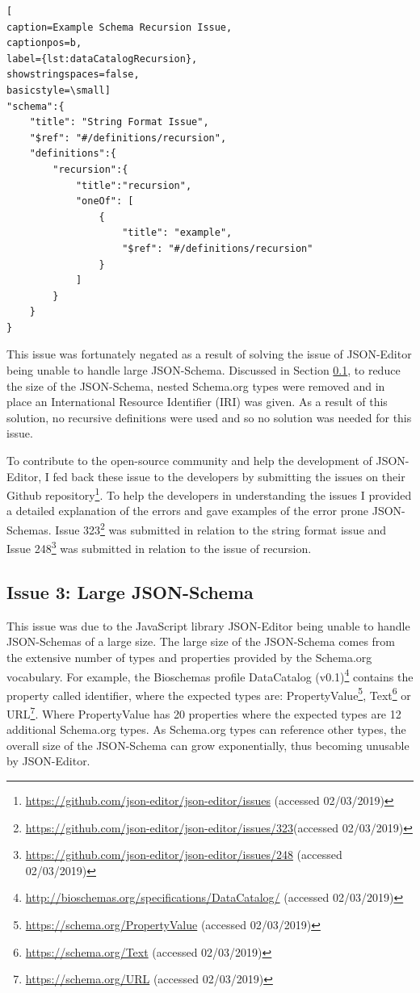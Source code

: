 {
\begin{center}
\begin{lstlisting}[
caption=Example Schema Recursion Issue,
captionpos=b,
label={lst:dataCatalogRecursion},
showstringspaces=false,
basicstyle=\small]
"schema":{
    "title": "String Format Issue",
    "$ref": "#/definitions/recursion",
    "definitions":{
        "recursion":{
            "title":"recursion",
            "oneOf": [
                {
                    "title": "example",
                    "$ref": "#/definitions/recursion"
                }
            ]
        }
    }
}
\end{lstlisting}  
\end{center}
}

This issue was fortunately negated as a result of solving the issue of JSON-Editor being unable to handle large JSON-Schema. Discussed in Section \ref{sec:largeSchema}, to reduce the size of the JSON-Schema, nested Schema.org types were removed and in place an International Resource Identifier (IRI) was given. As a result of this solution, no recursive definitions were used and so no solution was needed for this issue.


To contribute to the open-source community and help the development of JSON-Editor, I fed back these issue to the developers by submitting the issues on their Github repository\footnote{\url{https://github.com/json-editor/json-editor/issues} (accessed 02/03/2019)}. To help the developers in understanding the issues I provided a detailed explanation of the errors and gave examples of the error prone JSON-Schemas. Issue 323\footnote{\url{https://github.com/json-editor/json-editor/issues/323}(accessed 02/03/2019)} was submitted in relation to the string format issue and  Issue 248\footnote{\url{https://github.com/json-editor/json-editor/issues/248} (accessed 02/03/2019)} was submitted in relation to the issue of recursion.

\newpage
\subsection{Issue 3: Large JSON-Schema}\label{sec:largeSchema}
This issue was due to the JavaScript library JSON-Editor being unable to handle JSON-Schemas of a large size. The large size of the JSON-Schema comes from the extensive number of types and properties provided by the Schema.org vocabulary. For example, the Bioschemas profile DataCatalog (v0.1)\footnote{\url{http://bioschemas.org/specifications/DataCatalog/} (accessed 02/03/2019)} contains the property called identifier, where the expected types are: PropertyValue\footnote{\url{https://schema.org/PropertyValue} (accessed 02/03/2019)}, Text\footnote{\url{https://schema.org/Text} (accessed 02/03/2019)} or URL\footnote{\url{https://schema.org/URL} (accessed 02/03/2019)}. Where PropertyValue has 20 properties where the expected types are 12 additional Schema.org types. As Schema.org types can reference other types, the overall size of the JSON-Schema can grow exponentially, thus becoming unusable by JSON-Editor.


